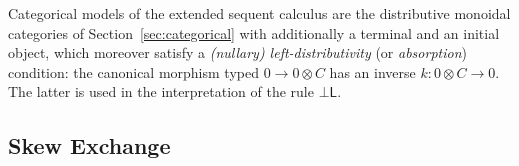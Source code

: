 \documentclass[submission,copyright,creativecommons]{eptcs}
\theoremstyle{definition}
\newcommand{\andr}{\land \mathsf{R}}
\newcommand{\orrone}{\lor \mathsf{R}_{1}}
\newcommand{\ot}{\otimes}
\newcommand{\RI}{\mathsf{RI}}
\newcommand{\F}{\mathsf{F}}
\newcommand{\topr}{\top \mathsf{R}}
\newcommand{\botl}{\bot \mathsf{L}}
\newcommand\cheng[1]{\mbox{}
{\marginpar{\color{blue}CSW}}
{\sf\noindent\color{blue}#1}}%
\begin{document}

Categorical models of the extended sequent calculus are the distributive monoidal categories of Section~\ref{sec:categorical} with additionally a terminal and an initial object, which moreover satisfy a \emph{(nullary) left-distributivity} (or \emph{absorption}) condition: the canonical morphism typed $0 \to 0 \ot C$ has an inverse $k : 0 \ot C \to 0$. The latter is used in the interpretation of the rule $\botl$.

\subsection{Skew Exchange}\label{subsec:Ex}
\end{document}
